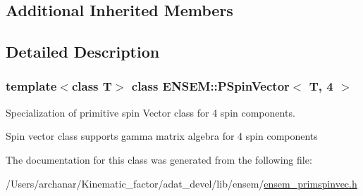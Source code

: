 \subsection*{Additional Inherited Members}


\subsection{Detailed Description}
\subsubsection*{template$<$class T$>$\newline
class E\+N\+S\+E\+M\+::\+P\+Spin\+Vector$<$ T, 4 $>$}

Specialization of primitive spin Vector class for 4 spin components. 

Spin vector class supports gamma matrix algebra for 4 spin components 

The documentation for this class was generated from the following file\+:\begin{DoxyCompactItemize}
\item 
/\+Users/archanar/\+Kinematic\+\_\+factor/adat\+\_\+devel/lib/ensem/\mbox{\hyperlink{lib_2ensem_2ensem__primspinvec_8h}{ensem\+\_\+primspinvec.\+h}}\end{DoxyCompactItemize}
